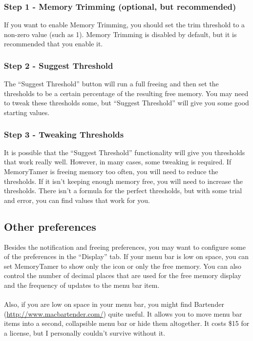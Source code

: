 \documentclass[]{article}
\begin{document}
\subsubsection*{Step 1 - Memory Trimming (optional, but recommended)}
If you want to enable Memory Trimming, you should set the trim threshold to a non-zero value (such as 1).  Memory Trimming is disabled by default, but it is recommended that you enable it.

\subsubsection*{Step 2 - Suggest Threshold}
The ``Suggest Threshold'' button will run a full freeing and then set the thresholds to be a certain percentage of the resulting free memory.  You may need to tweak these thresholds some, but ``Suggest Threshold'' will give you some good starting values.

\subsubsection*{Step 3 - Tweaking Thresholds}
It is possible that the ``Suggest Threshold'' functionality will give you thresholds that work really well.  However, in many cases, some tweaking is required.  If MemoryTamer is freeing memory too often, you will need to reduce the thresholds.  If it isn't keeping enough memory free, you will need to increase the thresholds.  There isn't a formula for the perfect thresholds, but with some trial and error, you can find values that work for you.

\subsection{Other preferences}
Besides the notification and freeing preferences, you may want to configure some of the preferences in the ``Display'' tab.  If your menu bar is low on space, you can set MemoryTamer to show only the icon or only the free memory.  You can also control the number of decimal places that are used for the free memory display and the frequency of updates to the menu bar item.\\
\\
Also, if you are low on space in your menu bar, you might find Bartender (\url{http://www.macbartender.com/}) quite useful.  It allows you to move menu bar items into a second, collapsible menu bar or hide them altogether.  It costs \$15 for a license, but I personally couldn't survive without it.
\end{document}
